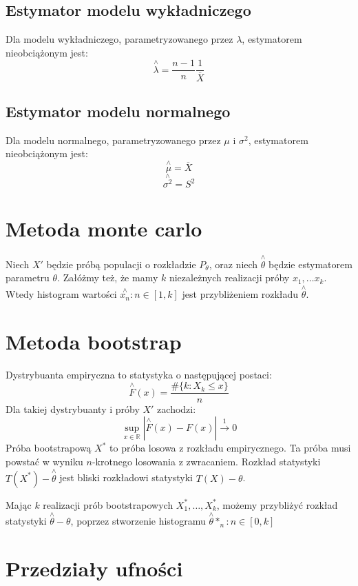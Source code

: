 \documentclass{../notatki}
\begin{document}
\subsection{Estymator modelu wykładniczego}

Dla modelu wykładniczego, parametryzowanego przez $\lambda$, estymatorem
nieobciążonym jest:
$$
\stackrel{\wedge}{\lambda} = \frac{n - 1}{n} \frac{1}{\overline{X}}
$$

\subsection{Estymator modelu normalnego}

Dla modelu normalnego, parametryzowanego przez $\mu$ i $\sigma^2$, estymatorem
nieobciążonym jest:
$$
\stackrel{\wedge}{\mu} = \overline{X}
$$
$$
\stackrel{\wedge}{\sigma^2} = S^2
$$

\section{Metoda monte carlo}

Niech $X'$ będzie próbą populacji o rozkładzie $P_\theta$, oraz niech
$\stackrel{\wedge}{\theta}$ będzie estymatorem parametru $\theta$. Załóżmy też,
że mamy $k$ niezależnych realizacji próby $x_1, \dots x_k$. Wtedy histogram
wartości $\stackrel{\wedge}{x_n}: n \in [1, k]$ jest przybliżeniem rozkładu
$\stackrel{\wedge}{\theta}$.

\section{Metoda bootstrap}

Dystrybuanta empiryczna to statystyka o następującej postaci:
$$
\stackrel{\wedge}{F}(x) = \frac{\#\{k: X_k \le x\}}{n}
$$
Dla takiej dystrybuanty i próby $X'$ zachodzi:
$$
\sup_{x \in \mathbb{R}} |\stackrel{\wedge}{F}(x) - F(x)| \xrightarrow{1} 0
$$
Próba bootstrapową $X^*$ to próba losowa z rozkładu empirycznego. Ta próba musi
powstać w wyniku $n$-krotnego losowania z zwracaniem. Rozkład statystyki
$T(X^*) - \stackrel{\wedge}{\theta}$ jest bliski rozkładowi statystyki
$T(X) - \theta$.

Mając $k$ realizacji prób bootstrapowych $X_1^*, \dots, X_k^*$, możemy
przybliżyć rozkład statystyki $\stackrel{\wedge}{\theta} - \theta$, poprzez
stworzenie histogramu $\stackrel{\wedge}{\theta}*_n: n\in [0,k]$

\section{Przedziały ufności}
\end{document}

